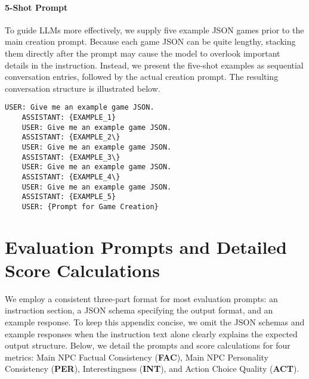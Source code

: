 \paragraph{5-Shot Prompt} To guide LLMs more effectively, we supply five example JSON games prior to the main creation prompt. Because each game JSON can be quite lengthy, stacking them directly after the prompt may cause the model to overlook important details in the instruction. Instead, we present the five-shot examples as sequential conversation entries, followed by the actual creation prompt. The resulting conversation structure is illustrated below.
\begin{center}
\begin{minipage}{0.95\textwidth}
\begin{lstlisting}[language=plaintext, frame=none, numbers=none]
    USER: Give me an example game JSON.
    ASSISTANT: {EXAMPLE_1}
    USER: Give me an example game JSON.
    ASSISTANT: {EXAMPLE_2\}
    USER: Give me an example game JSON.
    ASSISTANT: {EXAMPLE_3\}
    USER: Give me an example game JSON.
    ASSISTANT: {EXAMPLE_4\}
    USER: Give me an example game JSON.
    ASSISTANT: {EXAMPLE_5}
    USER: {Prompt for Game Creation}
\end{lstlisting}
\end{minipage}
\end{center}

\section{Evaluation Prompts and Detailed Score Calculations}\label{app:eval_prompt}
We employ a consistent three-part format for most evaluation prompts: an instruction section, a JSON schema specifying the output format, and an example response. To keep this appendix concise, we omit the JSON schemas and example responses when the instruction text alone clearly explains the expected output structure. Below, we detail the prompts and score calculations for four metrics: Main NPC Factual Consistency (\textbf{FAC}), Main NPC Personality Consistency (\textbf{PER}), Interestingness (\textbf{INT}), and Action Choice Quality (\textbf{ACT}).
